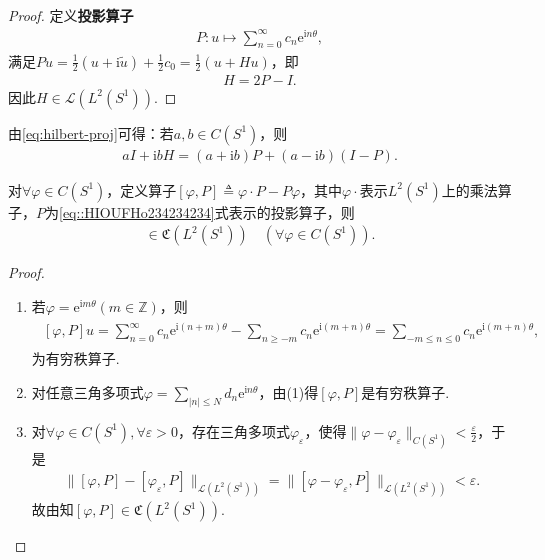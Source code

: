 \documentclass[../../main.tex]{subfiles}%
\begin{document}
\begin{proof}
定义\textbf{投影算子}
\begin{align}\label{eq::HIOUFHo234234234}
P:u\mapsto\sum\limits_{n=0}^{\infty}c_n\mathrm{e}^{\mathrm{i}n\theta},
\end{align}
满足$Pu=\frac{1}{2}(u+\mathrm{i}\widetilde{u})+\frac{1}{2}c_0=\frac{1}{2}(u+Hu)$，即
\begin{align}
H=2P-I.\label{eq:hilbert-proj}
\end{align}
因此$H\in\mathscr{L}(L^2(S^1))$.
\end{proof}

\begin{remark}
由\eqref{eq:hilbert-proj}可得：若$a,b\in C(S^1)$，则
\begin{align}
aI+\mathrm{i}bH=(a+\mathrm{i}b)P+(a-\mathrm{i}b)(I-P).\label{eq:h-op-decomp}
\end{align}
\end{remark}

\begin{lemma}\label{lemma:泛函分析--引理3.6.9}
对$\forall\varphi\in C(S^1)$，定义算子$[\varphi,P]\triangleq\varphi\cdot P-P\varphi$，其中$\varphi\cdot$表示$L^2(S^1)$上的乘法算子，$P$为\eqref{eq::HIOUFHo234234234}式表示的投影算子，则
\begin{align*}
[\varphi,P]\in\mathfrak{C}(L^2(S^1))\quad (\forall\varphi\in C(S^1)).
\end{align*}
\end{lemma}
\begin{proof}
\begin{enumerate}[(1)]
\item 若$\varphi=\mathrm{e}^{\mathrm{i}m\theta}(m\in\mathbb{Z})$，则
\begin{align*}
\begin{aligned}
[\varphi,P]u=\sum\limits_{n=0}^{\infty}c_n\mathrm{e}^{\mathrm{i}(n+m)\theta}-\sum\limits_{n\geqslant-m}c_n\mathrm{e}^{\mathrm{i}(m+n)\theta}
=\sum\limits_{-m\leqslant n\leqslant0}c_n\mathrm{e}^{\mathrm{i}(m+n)\theta},
\end{aligned}
\end{align*}
为有穷秩算子.
\item 对任意三角多项式$\varphi=\sum\limits_{|n|\leqslant N}d_n\mathrm{e}^{\mathrm{i}n\theta}$，由(1)得$[\varphi,P]$是有穷秩算子.
\item 对$\forall\varphi\in C(S^1),\forall\varepsilon>0$，存在三角多项式$\varphi_\varepsilon$，使得$\|\varphi-\varphi_\varepsilon\|_{C(S^1)}<\frac{\varepsilon}{2}$，于是
\begin{align*}
\|[\varphi,P]-[\varphi_\varepsilon,P]\|_{\mathscr{L}(L^2(S^1))}=\|[\varphi-\varphi_\varepsilon,P]\|_{\mathscr{L}(L^2(S^1))}<\varepsilon.
\end{align*}
故由知$[\varphi,P]\in\mathfrak{C}(L^2(S^1))$.
\end{enumerate}
\end{proof}
\end{document}
